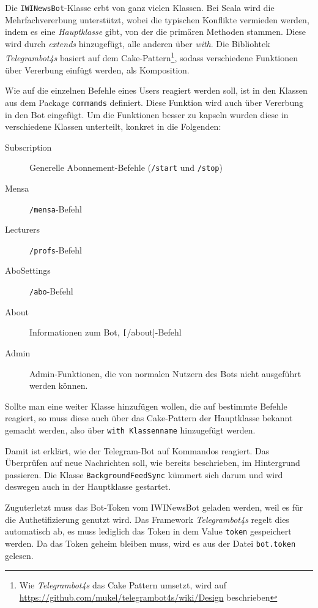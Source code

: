 Die \texttt{IWINewsBot}-Klasse erbt von ganz vielen Klassen. Bei Scala wird die Mehrfachvererbung unterstützt, wobei die typischen Konflikte vermieden werden, indem es eine \emph{Hauptklasse} gibt, von der die primären Methoden stammen. Diese wird durch \emph{extends} hinzugefügt, alle anderen über \emph{with}. Die Bibliohtek \emph{Telegrambot4s} basiert auf dem Cake-Pattern\footnote{Wie \emph{Telegrambot4s} das Cake Pattern umsetzt, wird auf \url{https://github.com/mukel/telegrambot4s/wiki/Design} beschrieben}, sodass verschiedene Funktionen über Vererbung einfügt werden, als Komposition.

Wie auf die einzelnen Befehle eines Users reagiert werden soll, ist in den Klassen aus dem Package \texttt{commands} definiert. Diese Funktion wird auch über Vererbung in den Bot eingefügt. Um die Funktionen besser zu kapseln wurden diese in verschiedene Klassen unterteilt, konkret in die Folgenden:

\begin{description}
  \item[Subscription] Generelle Abonnement-Befehle (\texttt{/start} und \texttt{/stop})
  \item[Mensa] \texttt{/mensa}-Befehl
  \item[Lecturers] \texttt{/profs}-Befehl
  \item[AboSettings] \texttt{/abo}-Befehl
  \item[About] Informationen zum Bot, \texttt[/about]-Befehl
  \item[Admin] Admin-Funktionen, die von normalen Nutzern des Bots nicht ausgeführt werden können.
\end{description}

Sollte man eine weiter Klasse hinzufügen wollen, die auf bestimmte Befehle reagiert, so muss diese auch über das Cake-Pattern der Hauptklasse bekannt gemacht werden, also über \texttt{with Klassenname} hinzugefügt werden.

Damit ist erklärt, wie der Telegram-Bot auf Kommandos reagiert. Das Überprüfen auf neue Nachrichten soll, wie bereits beschrieben, im Hintergrund passieren. Die Klasse \texttt{BackgroundFeedSync} kümmert sich darum und wird deswegen auch in der Hauptklasse gestartet.

Zuguterletzt muss das Bot-Token vom IWINewsBot geladen werden, weil es für die  Authetifizierung genutzt wird. Das Framework \emph{Telegrambot4s} regelt dies automatisch ab, es muss lediglich das Token in dem Value \texttt{token} gespeichert werden. Da das Token geheim bleiben muss, wird es aus der Datei \texttt{bot.token} gelesen.

